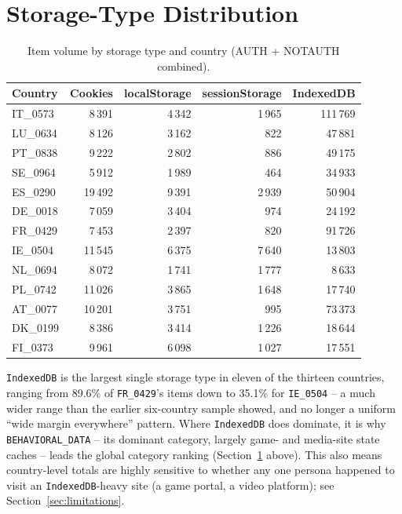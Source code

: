 \documentclass[11pt,a4paper]{article}
\newcommand{\code}[1]{\texttt{#1}}
\begin{document}
\section{Storage-Type Distribution}
\label{sec:storage}

\begin{table}[h]
\centering
\caption{Item volume by storage type and country (AUTH + NOTAUTH combined).}\label{tab:storage}
\small
\begin{tabular}{lrrrr}
\toprule
Country & Cookies & localStorage & sessionStorage & IndexedDB \\
\midrule
IT\_0573 & 8\,391 & 4\,342 & 1\,965 & 111\,769 \\
LU\_0634 & 8\,126 & 3\,162 & 822 & 47\,881 \\
PT\_0838 & 9\,222 & 2\,802 & 886 & 49\,175 \\
SE\_0964 & 5\,912 & 1\,989 & 464 & 34\,933 \\
ES\_0290 & 19\,492 & 9\,391 & 2\,939 & 50\,904 \\
DE\_0018 & 7\,059 & 3\,404 & 974 & 24\,192 \\
FR\_0429 & 7\,453 & 2\,397 & 820 & 91\,726 \\
IE\_0504 & 11\,545 & 6\,375 & 7\,640 & 13\,803 \\
NL\_0694 & 8\,072 & 1\,741 & 1\,777 & 8\,633 \\
PL\_0742 & 11\,026 & 3\,865 & 1\,648 & 17\,740 \\
AT\_0077 & 10\,201 & 3\,751 & 995 & 73\,373 \\
DK\_0199 & 8\,386 & 3\,414 & 1\,226 & 18\,644 \\
FI\_0373 & 9\,961 & 6\,098 & 1\,027 & 17\,551 \\
\bottomrule
\end{tabular}
\end{table}

\code{IndexedDB} is the largest single storage type in eleven of the thirteen
countries, ranging from 89.6\% of \code{FR\_0429}'s items down to
35.1\% for \code{IE\_0504} -- a much wider range than the earlier
six-country sample showed, and no longer a uniform ``wide margin everywhere''
pattern. Where \code{IndexedDB} does dominate, it is why
\code{BEHAVIORAL\_DATA} -- its dominant category, largely game- and media-site
state caches -- leads the global category ranking (Section~\ref{sec:storage}
above). This also means country-level totals are highly sensitive to whether
any one persona happened to visit an \code{IndexedDB}-heavy site (a game
portal, a video platform); see Section~\ref{sec:limitations}.
\end{document}
